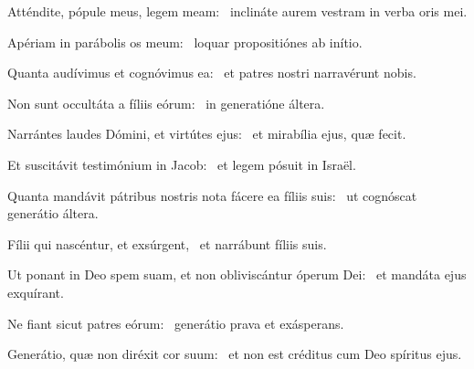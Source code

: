 \item Atténdite, pópule meus, legem meam:~\psstar{} inclináte aurem vestram in verba oris mei.

\item Apériam in parábolis os meum:~\psstar{} loquar propositiónes ab inítio.

\item Quanta audívimus et cognóvimus ea:~\psstar{} et patres nostri narravérunt nobis.

\item Non sunt occultáta a fíliis eórum:~\psstar{} in generatióne áltera.

\item Narrántes laudes Dómini, et virtútes ejus:~\psstar{} et mirabília ejus, quæ fecit.

\item Et suscitávit testimónium in Jacob:~\psstar{} et legem pósuit in Israël.

\item Quanta mandávit pátribus nostris nota fácere ea fíliis suis:~\psstar{} ut cognóscat generátio áltera.

\item Fílii qui nascéntur, et exsúrgent,~\psstar{} et narrábunt fíliis suis.

\item Ut ponant in Deo spem suam, et non obliviscántur óperum Dei:~\psstar{} et mandáta ejus exquírant.

\item Ne fiant sicut patres eórum:~\psstar{} generátio prava et exásperans.

\item Generátio, quæ non diréxit cor suum:~\psstar{} et non est créditus cum Deo spíritus ejus.
